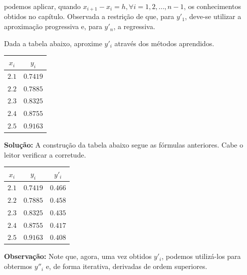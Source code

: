 \documentclass[12pt,openany]{book}
\begin{document}
podemos aplicar, quando $x_{i + 1} - x_i = h, \forall i = 1, 2, \dots, n - 1$, os conhecimentos obtidos no capítulo.
Observada a restrição de que, para $y'_1$, deve-se utilizar a aproximação progressiva e, para $y'_n$, a regressiva.

\begin{example}{}{}
    Dada a tabela abaixo, aproxime $y'_i$ através dos métodos aprendidos.

    \begin{center}
        \begin{tabular}{cc}
            \toprule
            $x_i$ & $y_i$ \\
            \midrule
            $2.1$ & $0.7419$ \\
            $2.2$ & $0.7885$ \\
            $2.3$ & $0.8325$ \\
            $2.4$ & $0.8755$ \\
            $2.5$ & $0.9163$ \\
            \bottomrule
        \end{tabular}
    \end{center}

    \vspace{1em}

    \textbf{Solução:}
    A construção da tabela abaixo segue as fórmulas anteriores.
    Cabe o leitor verificar a corretude.

    \begin{center}
        \begin{tabular}{ccc}
            \toprule
            $x_i$ & $y_i$ & $y'_i$ \\
            \midrule
            $2.1$ & $0.7419$ & $0.466$ \\
            $2.2$ & $0.7885$ & $0.458$ \\
            $2.3$ & $0.8325$ & $0.435$ \\
            $2.4$ & $0.8755$ & $0.417$ \\
            $2.5$ & $0.9163$ & $0.408$ \\
            \bottomrule
        \end{tabular}
    \end{center}

    \textbf{Observação:} Note que, agora, uma vez obtidos $y'_i$, podemos utilizá-los para obtermos $y''_i$ e, de forma iterativa, derivadas de ordem superiores.
\end{example}
\end{document}
